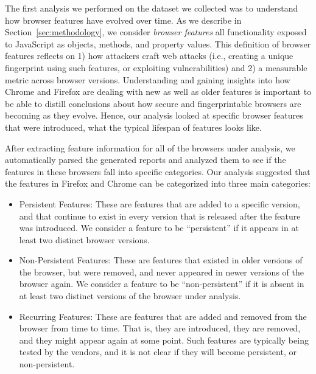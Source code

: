 The first analysis we performed on the dataset we collected was to
understand how browser features have evolved over time. As we describe in Section~\ref{sec:methodology}, we consider \textit{browser features} all functionality exposed to JavaScript as objects, methods, and property values. This definition of browser features reflects on 1) how attackers craft web attacks (i.e., creating a unique fingerprint using such features, or exploiting  vulnerabilities) and 2) a measurable metric across browser versions. Understanding
and gaining insights into how Chrome and Firefox are dealing with new
as well as older features is important to be able to distill
conclusions about how secure and fingerprintable browsers are becoming
as they evolve. Hence, our analysis looked at specific browser
features that were introduced, what the typical lifespan of features
looks like.

After extracting feature information for all of the browsers under
analysis, we automatically parsed the generated reports and analyzed
them to see if the features in these browsers fall into specific
categories. Our analysis suggested that the features in Firefox and
Chrome can be categorized into three main categories:

\begin{itemize}
  
\item Persistent Features: These are features that are added to a
  specific version, and that continue to exist in every version that
  is released after the feature was introduced. We consider a feature
  to be ``persistent'' if it appears in at least two distinct browser
  versions.
      
\item Non-Persistent Features: These are features that existed in
  older versions of the browser, but were removed, and never appeared
  in newer versions of the browser again. We consider a feature to be
  ``non-persistent'' if it is absent in at least two distinct versions
  of the browser under analysis.
      
\item Recurring Features: These are features that are added and
  removed from the browser from time to time. That is, they are
  introduced, they are removed, and they might appear again at some
  point. Such features are typically being tested by the vendors, and
  it is not clear if they will become persistent, or non-persistent.

\end{itemize}

